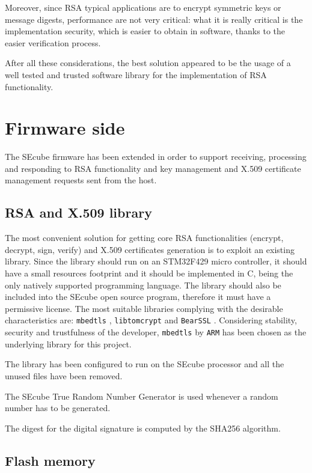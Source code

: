 Moreover, since RSA typical applications are to encrypt symmetric keys or
message digests, performance are not very critical: what it is really critical
is the implementation security, which is easier to obtain in software, thanks
to the easier verification process.

After all these considerations, the best solution appeared to be the usage of a
well tested and trusted software library for the implementation of RSA
functionality.

\section{Firmware side}
The SEcube firmware has been extended in order to support receiving, processing
and responding to RSA functionality and key management and X.509 certificate
management requests sent from the host.

\subsection{RSA and X.509 library}
The most convenient solution for getting core RSA functionalities (encrypt,
decrypt, sign, verify) and X.509 certificates generation is to exploit an
existing library.
Since the library should run on an STM32F429 micro controller, it should have a
small resources footprint and it should be implemented in C, being the only
natively supported programming language.
The library should also be included into the SEcube open source program,
therefore it must have a permissive license.
The most suitable libraries complying with the desirable characteristics are:
\texttt{mbedtls} \cite{mbedtls}, \texttt{libtomcrypt} \cite{libtomcrypt} and
\texttt{BearSSL} \cite{bearssl}.
Considering stability, security and trustfulness of the developer,
\texttt{mbedtls} by \texttt{ARM} has been chosen as the underlying library for
this project.

\bigskip
The library has been configured to run on the SEcube processor and all the
unused files have been removed.

The SEcube True Random Number Generator is used whenever a random number has to
be generated.

\bigskip
The digest for the digital signature is computed by the SHA256 algorithm.

\subsection{Flash memory}
